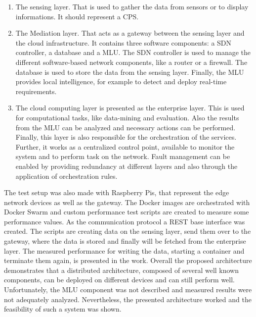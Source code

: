 \begin{enumerate}
  \item The sensing layer.
  That is used to gather the data from sensors or to display informations.
  It should represent a \ac{CPS}.
  \item The Mediation layer.
  That acts as a gateway between the sensing layer and the cloud infrastructure.
  It contains three software components: a \ac{SDN} controller, a database and a \ac{MLU}.\autocite[cf.][p. 1534]{Rufino:2017}
  The \ac{SDN} controller is used to manage the different software-based network components, like a router or a firewall.
  The database is used to store the data from the sensing layer.
  Finally, the \ac{MLU} provides local intelligence, for example to detect and deploy real-time requirements.\autocite[cf.][p. 1534]{Rufino:2017}
  \item The cloud computing layer is presented as the enterprise layer.
  This is used for computational tasks, like data-mining and evaluation.\autocite[cf.][p. 1534]{Rufino:2017}
  Also the results from the \ac{MLU} can be analyzed and necessary actions can be performed.\autocite[cf.][p. 1534]{Rufino:2017}
  Finally, this layer is also responsible for the orchestration of the services.
  Further, it works as a centralized control point, available to monitor the system and to perform task on the network.
  Fault management can be enabled by providing redundancy at different layers and also through the application of orchestration rules.\autocite[cf.][p. 1535]{Rufino:2017}
\end{enumerate}

The test setup was also made with Raspberry Pis, that represent the edge network devices as well as the gateway.
The Docker images are orchestrated with Docker Swarm and custom performance test scripts are created to measure some performance values.
As the communication protocol a \ac{REST} base interface was created.
The scripts are creating data on the sensing layer, send them over to the gateway, where the data is stored and finally will be fetched from the enterprise layer.\autocite[cf.][p. 1535]{Rufino:2017}
The measured performance for writing the data, starting a container and terminate them again, is presented in the work.
Overall the proposed architecture demonstrates that a distributed architecture, composed of several well known components, can be deployed on different devices and can still perform well.
Unfortunately, the \ac{MLU} component was not described and measured results were not adequately analyzed.
Nevertheless, the presented architecture worked and the feasibility of such a system was shown.

